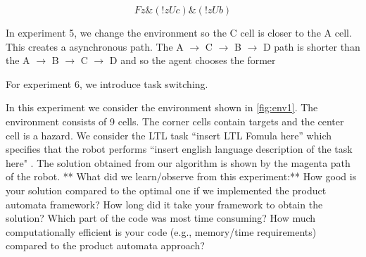 \documentclass[letter paper, 10 pt, conference]{ieeeconf}
\begin{document}
\begin{equation}
  Fz \& (!z U c) \& (!z U b)
  \label{equ:basic-ab}
\end{equation}

In experiment 5, we change the environment so the C cell is closer to the A cell. This creates a asynchronous path. The A $\rightarrow$ C $\rightarrow$ B $\rightarrow$ D path is shorter than the A $\rightarrow$ B $\rightarrow$ C $\rightarrow$ D and so the agent chooses the former

For experiment 6, we introduce task switching.


In this experiment we consider the environment shown in \ref{fig:env1}.
The environment consists of 9 cells. The corner cells contain targets and the center cell is a hazard.
We consider the LTL task ``insert LTL Fomula here'' which specifies that the robot performs ``insert english language description of the task here" .
The solution obtained from our algorithm is shown by the magenta path of the robot.
** What did we learn/observe from this experiment:**
How good is your solution compared to the optimal one if we implemented the product automata framework?
How long did it take your framework to obtain the solution?
Which part of the code was most time consuming?
How much computationally efficient is your code  (e.g., memory/time requirements) compared to the product automata approach?


% 
\end{document}
